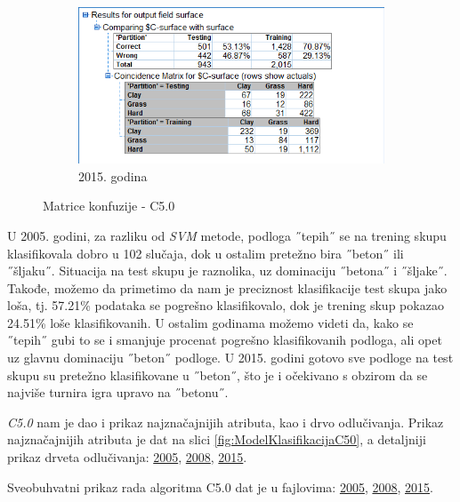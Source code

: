 \documentclass[a4paper]{article}
\begin{document}
\begin{figure}[H]
	\begin{subfigure}[h]{\textwidth}
		\begin{center}
			\includegraphics[scale=0.50]{Klasifikacija/C50/Analysis_Surface2015.png}
		\end{center}
		\caption{2015. godina}
		\label{fig:MatricaKnfuzijeC502015}
	\end{subfigure}
	
	\caption{Matrice konfuzije - C5.0}
	\label{fig:MatricaKnfuzijeC50}
\end{figure}

U 2005. godini, za razliku od \textit{SVM} metode, podloga ˝tepih˝ se na trening skupu klasifikovala dobro u 102 slučaja, dok u ostalim pretežno bira ˝beton˝ ili ˝šljaku˝. Situacija na test skupu je raznolika, uz dominaciju ˝betona˝ i ˝šljake˝. Takođe, možemo da primetimo da nam je preciznost klasifikacije test skupa jako loša, tj. 57.21\% podataka se pogrešno klasifikovalo, dok je trening skup pokazao 24.51\% loše klasifikovanih. U ostalim godinama možemo videti da, kako se ˝tepih˝ gubi to se i smanjuje procenat pogrešno klasifikovanih podloga, ali opet uz glavnu dominaciju ˝beton˝ podloge. U 2015. godini gotovo sve podloge na test skupu su pretežno klasifikovane u ˝beton˝, što je i očekivano s obzirom da se najviše turnira igra upravo na ˝betonu˝.

\textit{C5.0} nam je dao i prikaz najznačajnijih atributa, kao i drvo odlučivanja. Prikaz najznačajnijih atributa je dat na slici \ref{fig:ModelKlasifikacijaC50}, a detaljniji prikaz drveta odlučivanja: \href{file:./Klasifikacija/C50/Model_Surface2005.html}{2005}, \href{file:./Klasifikacija/C50/Model_Surface2008.html}{2008}, \href{file:./Klasifikacija/C50/Model_Surface2005.html}{2015}.  

Sveobuhvatni prikaz rada algoritma C5.0 dat je u fajlovima: \href{file:./Klasifikacija/C50/Summary_Surface2005.html}{2005}, \href{file:./Klasifikacija/C50/Summary_Surface2008.html}{2008}, \href{file:./Klasifikacija/C50/Summary_Surface2005.html}{2015}.  
\end{document}
